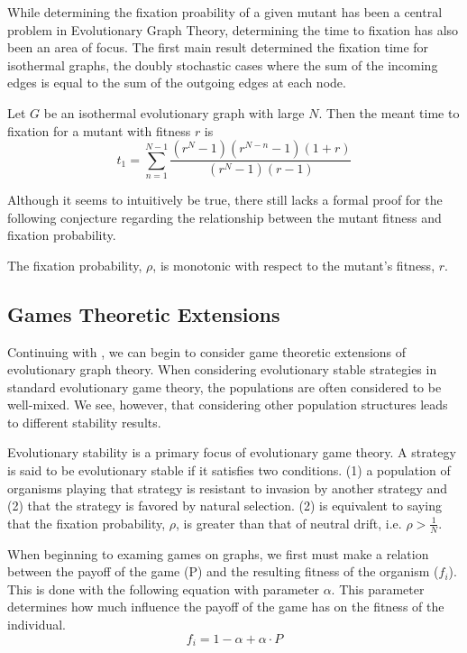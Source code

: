 \documentclass[12pt, AofM.tex]{subfiles}
\begin{document}
While determining the fixation proability of a given mutant has been a central problem in Evolutionary Graph Theory, determining the time to fixation has also been an area of focus. The first main result determined the fixation time for isothermal graphs, the doubly stochastic cases where the sum of the incoming edges is equal to the sum of the outgoing edges at each node. 
\begin{theorem}
    Let $G$ be an isothermal evolutionary graph with large $N$. Then the meant time to fixation for a mutant with fitness $r$ is
    \[t_1 = \sum_{n=1}^{N-1} \frac{(r^N-1)(r^{N-n}-1)(1+r)}{(r^N-1)(r-1)}\]
\end{theorem}
Although it seems to intuitively be true, there still lacks a formal proof for the following conjecture regarding the relationship between the mutant fitness and fixation probability.  
\begin{conjecture}
    The fixation probability, $\rho$, is monotonic with respect to the mutant's fitness, $r$. 
\end{conjecture}





\newpage
\subsection{Games Theoretic Extensions}
Continuing with \cite{shakarianReviewEvolutionaryGraph2012}, we can begin to consider game theoretic extensions of evolutionary graph theory. When considering evolutionary stable strategies in standard evolutionary game theory, the populations are often considered to be well-mixed. We see, however, that considering other population structures leads to different stability results.

Evolutionary stability is a primary focus of evolutionary game theory. A strategy is said to be evolutionary stable if it satisfies two conditions. (1) a population of organisms playing that strategy is resistant to invasion by another strategy and (2) that the strategy is favored by natural selection. (2) is equivalent to saying that the fixation probability, $\rho$, is greater than that of neutral drift, i.e. $\rho > \frac{1}{N}$.

When beginning to examing games on graphs, we first must make a relation between the payoff of the game (P) and the resulting fitness of the organism ($f_i$). This is done with the following equation with parameter $\alpha$. This parameter determines how much influence the payoff of the game has on the fitness of the individual. 
\[f_i = 1 - \alpha+\alpha\cdot P\]
\end{document}
